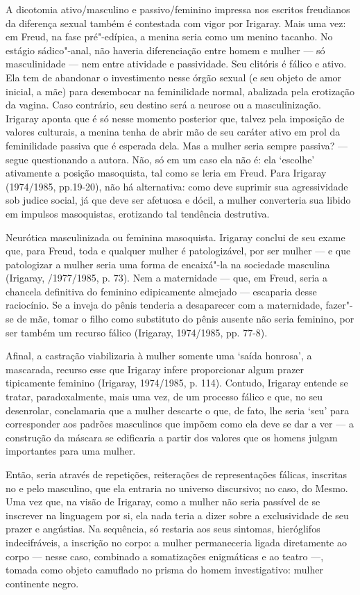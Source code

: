 A dicotomia ativo/masculino e passivo/feminino impressa nos escritos
freudianos da diferença sexual também é contestada com vigor por
Irigaray. Mais uma vez: em Freud, na fase pré"-edípica, a menina seria
como um menino tacanho. No estágio sádico"-anal, não haveria
diferenciação entre homem e mulher --- só masculinidade --- nem entre
atividade e passividade. Seu clitóris é fálico e ativo. Ela tem de
abandonar o investimento nesse órgão sexual (e seu objeto de amor
inicial, a mãe) para desembocar na feminilidade normal, abalizada pela
erotização da vagina. Caso contrário, seu destino será a neurose ou a
masculinização. Irigaray aponta que é só nesse momento posterior que,
talvez pela imposição de valores culturais, a menina tenha de abrir mão
de seu caráter ativo em prol da feminilidade passiva que é esperada
dela. Mas a mulher seria sempre passiva? --- segue questionando a autora.
Não, só em um caso ela não é: ela `escolhe' ativamente a posição
masoquista, tal como se leria em Freud. Para Irigaray (1974/1985,
pp.19-20), não há alternativa: como deve suprimir sua agressividade sob
judice social, já que deve ser afetuosa e dócil, a mulher converteria
sua libido em impulsos masoquistas, erotizando tal tendência destrutiva.

Neurótica masculinizada ou feminina masoquista. Irigaray conclui de seu
exame que, para Freud, toda e qualquer mulher é patologizável, por ser
mulher --- e que patologizar a mulher seria uma forma de encaixá"-la na
sociedade masculina (Irigaray, /1977/1985, p. 73). Nem a maternidade ---
que, em Freud, seria a chancela definitiva do feminino edipicamente
almejado --- escaparia desse raciocínio. Se a inveja do pênis tenderia a
desaparecer com a maternidade, fazer"-se de mãe, tomar o filho como
substituto do pênis ausente não seria feminino, por ser também um
recurso fálico (Irigaray, 1974/1985, pp. 77-8).

Afinal, a castração viabilizaria à mulher somente uma `saída honrosa', a
mascarada, recurso esse que Irigaray infere proporcionar algum prazer
tipicamente feminino (Irigaray, 1974/1985, p. 114). Contudo, Irigaray
entende se tratar, paradoxalmente, mais uma vez, de um processo fálico e
que, no seu desenrolar, conclamaria que a mulher descarte o que, de
fato, lhe seria `seu' para corresponder aos padrões masculinos que
impõem como ela deve se dar a ver --- a construção da máscara se
edificaria a partir dos valores que os homens julgam importantes para
uma mulher.

Então, seria através de repetições, reiterações de representações
fálicas, inscritas no e pelo masculino, que ela entraria no universo
discursivo; no caso, do Mesmo. Uma vez que, na visão de Irigaray, como a
mulher não seria passível de se inscrever na linguagem por si, ela nada
teria a dizer sobre a exclusividade de seu prazer e angústias. Na
sequência, só restaria aos seus sintomas, hieróglifos indecifráveis, a
inscrição no corpo: a mulher permaneceria ligada diretamente ao corpo
--- nesse caso, combinado a somatizações enigmáticas e ao teatro ---,
tomada como objeto camuflado no prisma do homem investigativo: mulher
continente negro.

